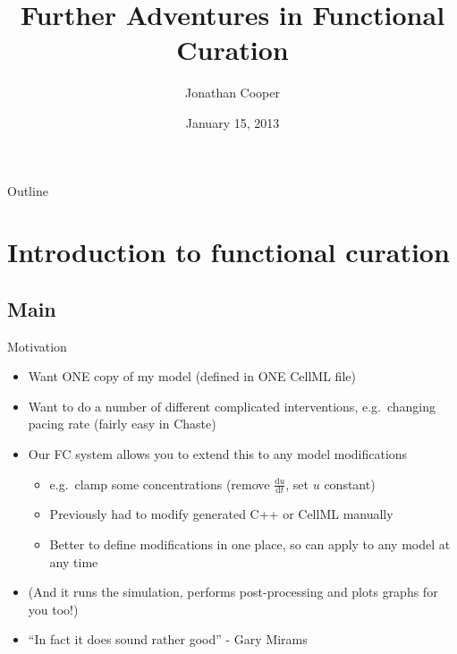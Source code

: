 \documentclass[t,xcolor={usenames,dvipsnames}]{beamer}
\title{Further Adventures in Functional Curation}
\author{Jonathan Cooper}
\institute[University of Oxford]
{Computational Biology Group\\
 Department of Computer Science\\
 University of Oxford}
\date{January 15, 2013}
\newcommand{\ud}{\mathrm{d}}
\newcommand{\dt}{\ud t}
\begin{document}
\begin{frame}
\titlepage
\end{frame}

\begin{frame}{Outline}
\setcounter{tocdepth}{1}
\tableofcontents
\end{frame}

\section{Introduction to functional curation}
\subsection*{Main}

\begin{frame}{Motivation}
\begin{itemize}
\item Want ONE copy of my model (defined in ONE CellML file)
\item Want to do a number of different complicated interventions, e.g.\ changing pacing rate (fairly easy in Chaste)
\item Our FC system allows you to extend this to any model modifications
  \begin{itemize}
  \item e.g.\ clamp some concentrations (remove $\frac{\ud u}{\dt}$, set $u$ constant)
  \item Previously had to modify generated C++ or CellML manually
  \item Better to define modifications in one place, so can apply to any model at any time
  \end{itemize}
\item (And it runs the simulation, performs post-processing and plots graphs for you too!)
\item ``In fact it does sound rather good'' - Gary Mirams
\end{itemize}
\end{frame}
\end{document}

